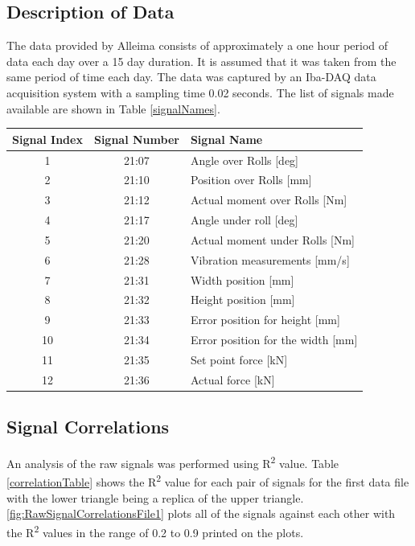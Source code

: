\documentclass[]{article}
\begin{document}
\subsection{Description of Data}
The data provided by Alleima consists of approximately a one hour period of data each day over a 15 day duration. It is assumed that it was taken from the same period of time each day. The data was captured by an Iba-DAQ data acquisition system with a sampling time 0.02 seconds. The list of signals made available are shown in Table \ref{signalNames}.
\begin{center}
\label{signalNames}
\begin{tabular}{ |c|c|l| }
 \hline
Signal Index & Signal Number & Signal Name \\ 
 \hline
1 & 21:07 & Angle over Rolls [deg] \\
 \hline
2 & 21:10 & Position over Rolls [mm] \\
 \hline
3 & 21:12 & Actual moment over Rolls [Nm] \\
 \hline
4 & 21:17 & Angle under roll [deg] \\
 \hline
5 & 21:20 & Actual moment under Rolls [Nm] \\
 \hline
6 & 21:28 & Vibration measurements [mm/s] \\ 
 \hline              
7 & 21:31 & Width position [mm] \\
 \hline
8 & 21:32 & Height position [mm] \\
 \hline
9 & 21:33 & Error position for height [mm] \\
 \hline
10 & 21:34 & Error position for the width [mm] \\
 \hline
11 & 21:35 & Set point force [kN] \\
 \hline
12 & 21:36 & Actual force [kN] \\
 \hline
\end{tabular}
\end{center}

\subsection{Signal Correlations}
An analysis of the raw signals was performed using R\textsuperscript{2} value. Table \ref{correlationTable} shows the R\textsuperscript{2} value for each pair of signals for the first data file with the lower triangle being a replica of the upper triangle.\cref{fig:RawSignalCorrelationsFile1} plots all of the signals against each other with the R\textsuperscript{2} values in the range of 0.2 to 0.9 printed on the plots. 
\end{document}
